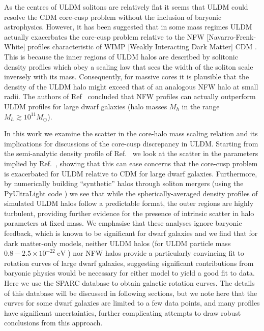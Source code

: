 \documentclass[a4paper,11pt]{article}
\begin{document}
As the  centres of ULDM solitons are relatively flat it seems that ULDM could  resolve the CDM core-cusp problem without the inclusion of baryonic astrophysics. However, it has  been suggested that in some mass regimes ULDM actually exacerbates the core-cusp problem relative to the NFW [Navarro-Frenk-White] profiles  \cite{Navarro:1995iw} characteristic of WIMP [Weakly Interacting Dark Matter] CDM \cite{Robles:2018fur}. This is because the inner regions of ULDM halos are described by solitonic density profiles which obey a scaling law that sees the width of the soliton scale inversely with its mass. Consequently, for massive cores it is plausible that the density of the ULDM halo might exceed that of an analogous NFW halo at small radii. The authors of Ref~\cite{Robles:2018fur} concluded that NFW profiles can actually outperform ULDM profiles for large dwarf galaxies (halo masses $M_h$ in the range $M_h \gtrsim 10^{11} M_{\odot}$).  

In this work we examine the scatter in the core-halo mass scaling relation and its implications for discussions of the core-cusp discrepancy in ULDM. Starting from the semi-analytic density profile of Ref.~\cite{Robles:2018fur} we look at the scatter in the parameters implied by Ref.~\cite{Schive:2014hza}, showing that this can ease concerns that the core-cusp problem is  exacerbated for ULDM relative to CDM for large dwarf galaxies. Furthermore, by numerically building ``synthetic'' halos through soliton mergers (using the {\sc PyUltraLight} code \cite{Edwards:2018ccc}) we see that while the spherically-averaged density profiles of simulated ULDM halos follow a predictable format, the outer regions are highly turbulent, providing further evidence for the presence of intrinsic scatter in halo parameters at fixed mass. We emphasise that these analyses ignore baryonic feedback, which is known to be significant for dwarf galaxies \cite{2018MNRAS.473.5698D, Benitez-Llambay:2018} and we find that for dark matter-only models, neither ULDM halos (for ULDM particle mass $0.8-2.5\times 10^{-22} \operatorname{eV}$)
nor NFW halos provide a particularly convincing fit to rotation curves of large dwarf galaxies, suggesting significant contributions from baryonic physics would be necessary for either model to yield a good fit to data. Here we use the SPARC database \cite{Lelli:2016zqa} to obtain galactic rotation curves. The details of this database will be discussed in following sections, but we note here that the curves for some dwarf galaxies are limited to a few data points, and many profiles have significant uncertainties, further complicating attempts to draw robust conclusions from this approach. 
\end{document}
